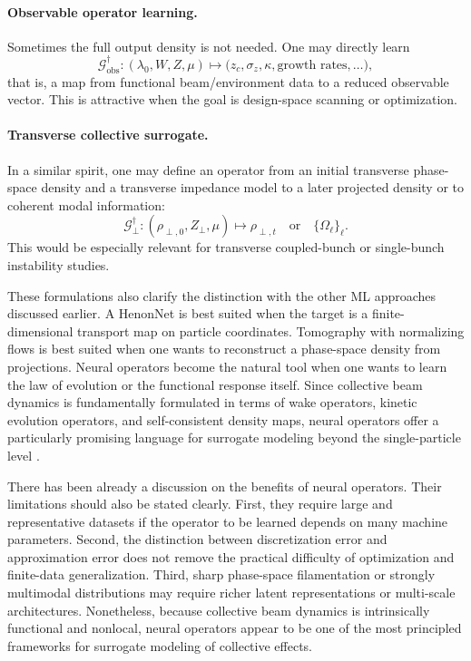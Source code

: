 \documentclass[11pt,a4paper]{article}
\begin{document}
\begin{sloppypar}
\paragraph{ Observable operator learning.}
Sometimes the full output density is not needed. One may directly learn
\begin{equation}
\mathcal G^\dagger_{\mathrm{obs}}:
(\lambda_0,W,Z,\mu)
\mapsto
\bigl(z_c,\sigma_z,\kappa,\text{growth rates},\dots\bigr),
\label{eq:NO_obs}
\end{equation}
that is, a map from functional beam/environment data to a reduced observable vector. This is attractive when the goal is design-space scanning or optimization.

\paragraph{ Transverse collective surrogate.}
In a similar spirit, one may define an operator from an initial transverse phase-space density and a transverse impedance model to a later projected density or to coherent modal information:
\begin{equation}
\mathcal G^\dagger_{\perp}:
(\rho_{\perp,0}, Z_\perp,\mu)
\mapsto
\rho_{\perp,t}
\quad\text{or}\quad
\{\Omega_\ell\}_\ell .
\label{eq:NO_transverse}
\end{equation}
This would be especially relevant for transverse coupled-bunch or single-bunch instability studies.

These formulations also clarify the distinction with the other ML approaches discussed earlier. A HenonNet is best suited when the target is a finite-dimensional transport map on particle coordinates. Tomography with normalizing flows is best suited when one wants to reconstruct a phase-space density from projections. Neural operators become the natural tool when one wants to learn the law of evolution or the functional response itself. Since collective beam dynamics is fundamentally formulated in terms of wake operators, kinetic evolution operators, and self-consistent density maps, neural operators offer a particularly promising language for surrogate modeling beyond the single-particle level \cite{kovachki_neural_nodate,hoover_high-dimensional_2024}.

There has been already a discussion on the benefits of neural operators. Their limitations should also be stated clearly. First, they require large and representative datasets if the operator to be learned depends on many machine parameters. Second, the distinction between discretization error and approximation error does not remove the practical difficulty of optimization and finite-data generalization. Third, sharp phase-space filamentation or strongly multimodal distributions may require richer latent representations or multi-scale architectures. Nonetheless, because collective beam dynamics is intrinsically functional and nonlocal, neural operators appear to be one of the most principled frameworks for surrogate modeling of collective effects.


\end{sloppypar}
\end{document}
